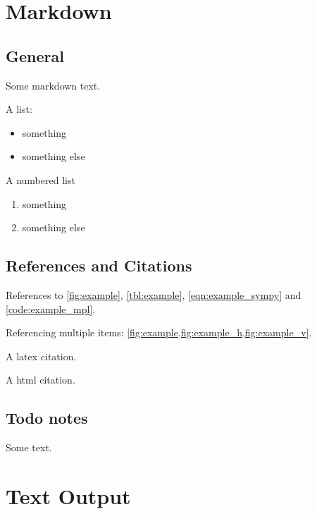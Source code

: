 \documentclass[10pt,parskip=half,
	toc=sectionentrywithdots,
	bibliography=totocnumbered,
	captions=tableheading,numbers=noendperiod]{scrartcl}
\providecommand{\tightlist}{%
  \setlength{\itemsep}{0pt}\setlength{\parskip}{0pt}}
\begin{document}
		\begingroup
    \let\cleardoublepage\relax
    \let\clearpage\relax\tableofcontents\listoffigures\listoftables{}
    \endgroup

\section{Markdown}\label{markdown}

\subsection{General}\label{general}

Some markdown text.

A list:

\begin{itemize}
\tightlist
\item
  something
\item
  something else
\end{itemize}

A numbered list

\begin{enumerate}
\def\labelenumi{\arabic{enumi}.}
\tightlist
\item
  something
\item
  something else
\end{enumerate}

\subsection{References and Citations}\label{references-and-citations}

References to \cref{fig:example}, \cref{tbl:example},
\cref{eqn:example_sympy} and \cref{code:example_mpl}.

Referencing multiple items:
\cref{fig:example,fig:example_h,fig:example_v}.

A latex citation.\cite{zelenyak_molecular_2016}

A html citation.\cite{kirkeminde_thermodynamic_2012}

\subsection{Todo notes}\label{todo-notes}


Some text.

\section{Text Output}\label{text-output}
\end{document}
